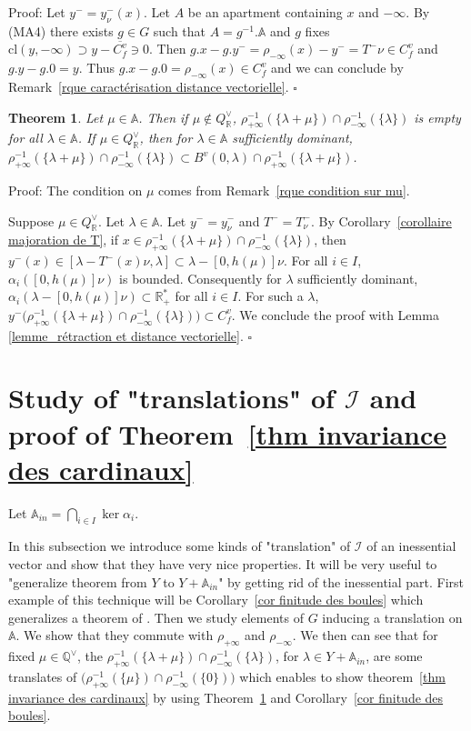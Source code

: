 \documentclass[12pt]{article}
\theoremstyle{plain}
\newtheorem{thm}{Theorem}[section] %
\theoremstyle{definition}
\newcommand{\R}{\mathbb{R}}
\newcommand{\A}{\mathbb{A}}
\newcommand{\Q}{\mathbb{Q}}
\newcommand{\I}{\mathcal{I}}
\begin{document}
Proof: Let $y^-=y^-_\nu(x)$. Let $A$ be an apartment containing $x$ and $-\infty$. By (MA4) there exists $g\in G$ such that $A=g^{-1}.\A$ and $g$ fixes $\mathrm{cl}(y,-\infty)\supset y-\overline{C_f^v}\ni 0$. Then $g.x-g.y^-=\rho_{-\infty}(x)-y^-=T^-\nu\in C_f^v$ and $g.y-g.0=y$. Thus $g.x-g.0=\rho_{-\infty}(x)\in C_f^v$ and we can conclude by Remark~\ref{rque caractérisation distance vectorielle}. $\square$




\begin{thm}\label{thm inclusion}
Let $\mu\in \A$. Then if $\mu\notin Q_{\R}^\vee$, $\rho_{+\infty}^{-1}(\{\lambda+\mu\})\cap \rho_{-\infty}^{-1}(\{\lambda\})$ is empty for all $\lambda\in \A$. If $\mu\in Q^\vee_{\R}$, then for $\lambda\in \A$ sufficiently dominant, $\rho_{+\infty}^{-1}(\{\lambda+\mu\})\cap \rho_{-\infty}^{-1}(\{\lambda\})\subset B^v(0,\lambda)\cap \rho_{+\infty}^{-1}(\{\lambda+\mu\}) $. 
\end{thm}

Proof: The condition on $\mu$ comes from Remark~\ref{rque condition sur mu}. 

Suppose $\mu\in Q^\vee_\R$.
Let $\lambda\in \A$. Let $y^-=y^-_\nu$ and $T^-=T_\nu^-$. By Corollary~\ref{corollaire majoration de T}, if $x\in \rho_{+\infty}^{-1}(\{\lambda+\mu\})\cap \rho_{-\infty}^{-1}(\{\lambda\})$, then $y^-(x)\in [\lambda-T^-(x)\nu, \lambda]\subset \lambda-[0,h(\mu)]\nu$. 
For all $i\in I$, $\alpha_i([0,h(\mu)]\nu)$ is bounded. Consequently for $\lambda$ sufficiently dominant, $\alpha_i(\lambda-[0,h(\mu)]\nu)\subset \mathbb{R}^*_+$ for all $i\in I$.  For such a $\lambda$,  $y^-\big(\rho_{+\infty}^{-1}(\{\lambda+\mu\})\cap \rho_{-\infty}^{-1}(\{\lambda\})\big)\subset C^v_f$. We conclude the proof with Lemma \ref{lemme_rétraction et distance vectorielle}.
 $\square$

\section{Study of "translations" of $\I$ and proof of Theorem~\ref{thm invariance des cardinaux}}\label{sect translations}

Let $\A_{in}=\bigcap_{i\in I} \ker \alpha_i$.

In this subsection we introduce some kinds of "translation" of $\I$ of an inessential vector and show that they have very nice properties. It will be very useful to "generalize theorem from $Y$ to $Y+\A_{in}$" by getting rid of the inessential part. First example of this technique will be Corollary~\ref{cor finitude des boules} which generalizes a theorem of \cite{gaussent2014spherical}. Then we study elements of $G$ inducing a translation on $\A$. We show that they commute with $\rho_{+\infty}$ and $\rho_{-\infty}$. We then can see that for fixed $\mu\in\Q^\vee$, the $\rho_{+\infty}^{-1}(\{\lambda+\mu\})\cap\rho_{-\infty}^{-1}(\{\lambda\})$, for $\lambda\in Y+\A_{in}$, are some translates of  $\big(\rho_{+\infty}^{-1}(\{\mu\})\cap\rho_{-\infty}^{-1}(\{0\})\big)$  which enables to show theorem~\ref{thm invariance des cardinaux} by using Theorem~\ref{thm inclusion} and Corollary~\ref{cor finitude des boules}.
\end{document}
